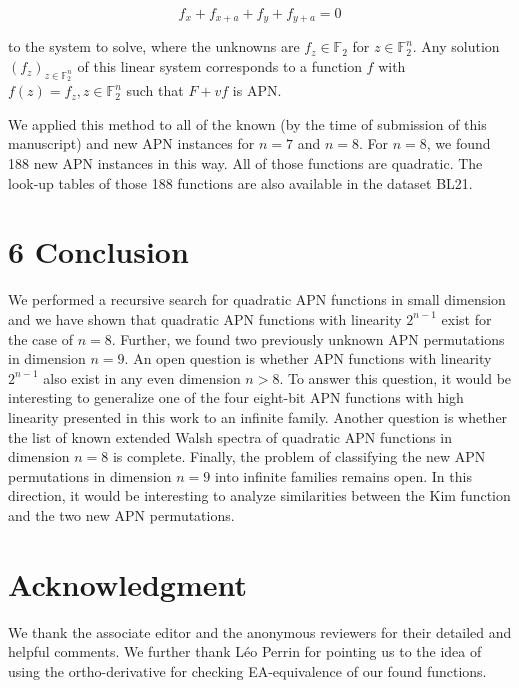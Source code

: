 \documentclass[10pt]{article}
\begin{document}
$$
f_{x}+f_{x+a}+f_{y}+f_{y+a}=0
$$

to the system to solve, where the unknowns are $f_{z} \in \mathbb{F}_{2}$ for $z \in \mathbb{F}_{2}^{n}$. Any solution $\left(f_{z}\right)_{z \in \mathbb{F}_{2}^{n}}$ of this linear system corresponds to a function $f$ with $f(z)=f_{z}, z \in \mathbb{F}_{2}^{n}$ such that $F+v f$ is APN.

We applied this method to all of the known (by the time of submission of this manuscript) and new APN instances for $n=7$ and $n=8$. For $n=8$, we found 188 new APN instances in this way. All of those functions are quadratic. The look-up tables of those 188 functions are also available in the dataset BL21.

\section*{6 Conclusion}
We performed a recursive search for quadratic APN functions in small dimension and we have shown that quadratic APN functions with linearity $2^{n-1}$ exist for the case of $n=8$. Further, we found two previously unknown APN permutations in dimension $n=9$. An open question is whether APN functions with linearity $2^{n-1}$ also exist in any even dimension $n>8$. To answer this question, it would be interesting to generalize one of the four eight-bit APN functions with high linearity presented in this work to an infinite family. Another question is whether the list of known extended Walsh spectra of quadratic APN functions in dimension $n=8$ is complete. Finally, the problem of classifying the new APN permutations in dimension $n=9$ into infinite families remains open. In this direction, it would be interesting to analyze similarities between the Kim function and the two new APN permutations.

\section*{Acknowledgment}
We thank the associate editor and the anonymous reviewers for their detailed and helpful comments. We further thank Léo Perrin for pointing us to the idea of using the ortho-derivative for checking EA-equivalence of our found functions.
\end{document}
